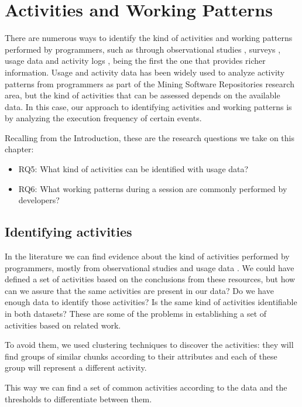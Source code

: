\chapter{Activities and Working Patterns}
There are numerous ways to identify the kind of activities and working patterns performed by programmers, such as through observational studies \cite{GM04}, surveys \cite{PR11}, usage data \cite{MPB12} and activity logs \cite{CLQ15}, being the first the one that provides richer information. Usage and activity data has been widely used to analyze activity patterns from programmers as part of the Mining Software Repositories research area, but the kind of activities that can be assessed depends on the available data. In this case, our approach to identifying activities and working patterns is by analyzing the execution frequency of certain events.

Recalling from the Introduction, these are the research questions we take on this chapter:
\begin{itemize}
	\item RQ5: What kind of activities can be identified with usage data?
	\item RQ6: What working patterns during a session are commonly performed by developers?
\end{itemize}

\section{Identifying activities}
In the literature we can find evidence about the kind of activities performed by programmers, mostly from observational studies and usage data \cite{LVD06, GM04, MMLK14, MKF06}. We could have defined a set of activities based on the conclusions from these resources, but how can we assure that the same activities are present in our data? Do we have enough data to identify those activities? Is the same kind of activities identifiable in both datasets? These are some of the problems in establishing a set of activities based on related work. \begin{changedforreviewerlong}
To avoid them, we used clustering techniques to discover the activities: they will find groups of similar chunks according to their attributes and each of these group will represent a different activity. \end{changedforreviewerlong} This way we can find a set of common activities according to the data and the thresholds to differentiate between them.

